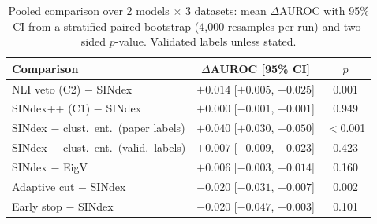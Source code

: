 \begin{table}[t]\centering
\caption{Pooled comparison over 2 models $\times$ 3 datasets: mean $\Delta$AUROC with 95\% CI from a stratified paired bootstrap (4{,}000 resamples per run) and two-sided $p$-value. Validated labels unless stated.}
\label{tab:pooled}\scriptsize\setlength{\tabcolsep}{2.5pt}
\begin{tabular}{lcc}\toprule
Comparison & $\Delta$AUROC [95\% CI] & $p$\\\midrule
NLI veto (C2) $-$ SINdex & $+0.014$ [$+0.005$, $+0.025$] & 0.001\\
SINdex++ (C1) $-$ SINdex & $+0.000$ [$-0.001$, $+0.001$] & 0.949\\
SINdex $-$ clust.\ ent.\ (paper labels) & $+0.040$ [$+0.030$, $+0.050$] & $<$0.001\\
SINdex $-$ clust.\ ent.\ (valid.\ labels) & $+0.007$ [$-0.009$, $+0.023$] & 0.423\\
SINdex $-$ EigV~\cite{lin2024generating} & $+0.006$ [$-0.003$, $+0.014$] & 0.160\\
Adaptive cut $-$ SINdex & $-0.020$ [$-0.031$, $-0.007$] & 0.002\\
Early stop $-$ SINdex & $-0.020$ [$-0.047$, $+0.003$] & 0.101\\
\bottomrule\end{tabular}\end{table}